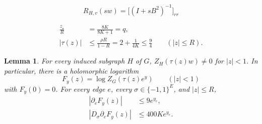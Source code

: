 \documentclass[10pt,a4paper]{amsart}
\newtheorem{lemma}{Lemma}
\begin{document}
\begin{equation}
 R_{H,v}(sw)=\bigl[(I+sB^2)^{-1}\bigr]_{rr}
\end{equation}

\begin{equation}\label{eq:interpolation-contour-bounds}
 \begin{aligned}
  \frac{z_\star}{R}&=\frac{8K}{8K+1}=q,\\
  |\tau(z)|&\le\frac{\rho R}{1-R}
             =2+\frac1{4K}\le\frac94
             \qquad(|z|\le R).
 \end{aligned}
\end{equation}

\begin{lemma}\label{lem:analytic-derivatives}
For every induced subgraph $H$ of $G$,
$Z_H(\tau(z)w)\ne0$ for $|z|<1$. In particular, there is a
holomorphic logarithm
\[
 F_y(z)=\log Z_G(\tau(z)e^y)
 \qquad(|z|<1)
\]
with $F_y(0)=0$. For every edge $e$, every
$\sigma\in\{-1,1\}^E$, and $|z|\le R$,
\begin{align}
 |\partial_eF_y(z)|&\le9e^{y_e},
 \label{eq:analytic-gradient-bound}\\
 |D_\sigma\partial_eF_y(z)|&\le400K e^{y_e}.
 \label{eq:analytic-signed-hessian-bound}
\end{align}
\end{lemma}
\end{document}
